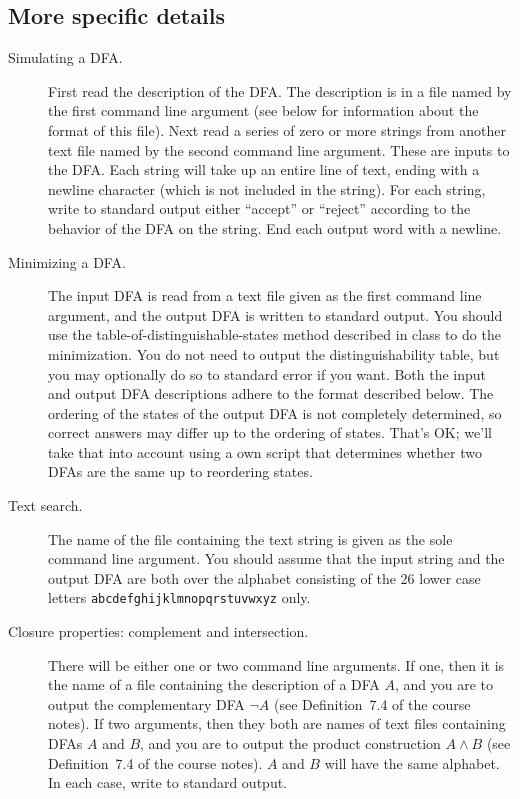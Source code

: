 \subsection*{More specific details}
\begin{description}
\item[Simulating a DFA\@.]
First read the description of the DFA\@.
The description is in a file named by the first command line argument
(see below for information about the format of this file).
Next read a series of zero or more strings from another text file named
by the second command line argument.
These are inputs to the DFA\@.
Each string will take up an entire line of text, ending with a newline
character (which is not included in the string).
For each string, write to standard output either ``accept'' or ``reject''
according to the behavior of the DFA on the string.
End each output word with a newline.

\item[Minimizing a DFA\@.]
The input DFA is read from a text file given as the first command
line argument, and the output DFA is written to standard output.
You should use the table-of-distinguishable-states method described
in class to do the minimization.
You do not need to output the distinguishability table, but you may
optionally do so to standard error if you want.
Both the input and output DFA descriptions adhere to the format described below.
The ordering of the states of the output DFA is not completely
determined, so correct answers may differ up to the ordering of states.
That's OK; we'll take that into account using a own script that determines
whether two DFAs are the same up to reordering states.

\item[Text search.]
The name of the file containing the text string is given as the sole
command line argument.
You should assume that the input string and the output DFA are both over
the alphabet consisting of the 26 lower case letters
\texttt{abcdefghijklmnopqrstuvwxyz} only.

\item[Closure properties: complement and intersection.]
There will be either one or two command line arguments.
If one, then it is the name of a file containing the description of
a DFA $A$, and you are to output the complementary DFA $\neg A$
(see Definition~7.4 of the course notes).
If two arguments, then they both are names of text files containing
DFAs $A$ and $B$, and you are to output the product construction
$A\wedge B$ (see Definition~7.4 of the course notes).
$A$ and $B$ will have the same alphabet.
In each case, write to standard output.


\end{description}
